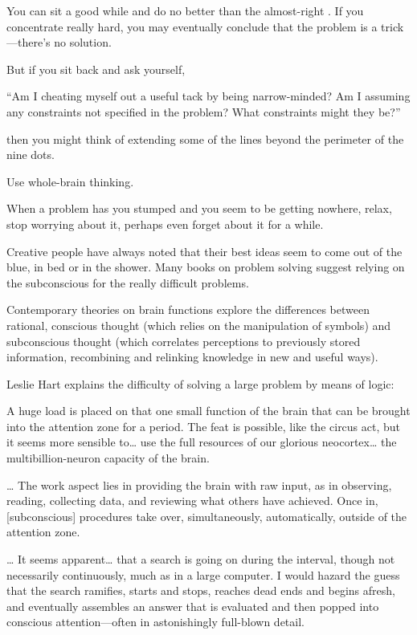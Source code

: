 
You can sit a good while and do no better than the almost-right
. If you concentrate really hard, you may eventually conclude
that the problem is a trick---there's no solution.



But if you sit back and ask yourself,
\begin{tfquot}
``Am I cheating myself out a useful tack by being narrow-minded? Am I
assuming any constraints not specified in the problem? What constraints
might they be?''
\end{tfquot}
then you might think of extending some of the lines beyond the perimeter
of the nine dots.

\begin{tip}
Use whole-brain thinking.
\end{tip}
When a problem has you stumped and you seem to be getting nowhere,
relax, stop worrying about it, perhaps even forget about it for a while.

Creative people have always noted that their best ideas seem to
come out of the blue, in bed or in the shower. Many books on problem
solving suggest relying on the subconscious for the really difficult
problems.

Contemporary theories on brain functions explore the differences
between rational, conscious thought (which relies on the manipulation of
symbols) and subconscious thought (which correlates perceptions to
previously stored information, recombining and relinking knowledge in
new and useful ways).

Leslie Hart \cite{hart75} explains the
difficulty of solving a large problem by means of logic:

\begin{tfquot}
A huge load is placed on that one small function of the brain that can be
brought into the attention zone for a period. The feat is possible, like the
circus act, but it seems more sensible to\dots{} use the full resources of our
glorious neocortex\dots{} the multibillion-neuron capacity of the brain.

\dots{} The work aspect lies in providing the brain with raw input, as in
observing, reading, collecting data, and reviewing what others have achieved.
Once in, [subconscious] procedures take over, simultaneously, automatically,
outside of the attention zone.

\dots{} It seems apparent\dots{} that a search is going on during the interval,
though not necessarily continuously, much as in a large computer. I would
hazard the guess that the search ramifies, starts and stops, reaches dead
ends and begins afresh, and eventually assembles an answer that is
evaluated and then popped into conscious attention---often in astonishingly
full-blown detail.
\end{tfquot}

